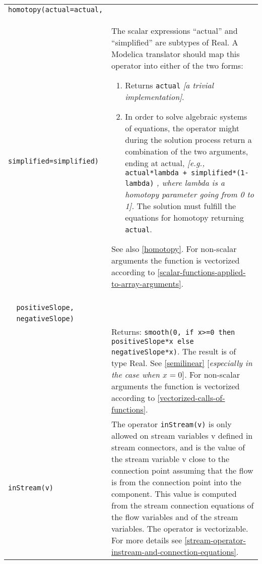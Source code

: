 \begin{longtable}{|p{5.1cm}|p{8cm}|}
\lstinline[basicstyle=\ttfamily]!homotopy(actual=actual,!\\
\lstinline[basicstyle=\ttfamily]!   simplified=simplified)! & The scalar expressions ``actual'' and ``simplified'' are subtypes of
Real. A Modelica translator should map this operator into either of the
two forms:

\begin{enumerate}
\item
  Returns \lstinline[basicstyle=\ttfamily]!actual! \emph{{[}a trivial implementation{]}}.
\item
  In order to solve algebraic systems of equations, the operator might
  during the solution process return a combination of the two arguments,
  ending at actual, \emph{{[}e.g.,}
  \lstinline[basicstyle=\ttfamily]!actual*lambda + simplified*(1-lambda)! \emph{,
  where lambda is a homotopy parameter going from 0 to 1{]}.}
  The solution must fulfill the equations for homotopy returning
  \lstinline[basicstyle=\ttfamily]!actual!.
\end{enumerate}

See also \autoref{homotopy}. For non-scalar arguments the function is
vectorized according to \autoref{scalar-functions-applied-to-array-arguments}.\\ 
\hline

\begin{tabular}{@{}p{5.1cm}@{}}
\lstinline[basicstyle=\ttfamily]!semiLinear(x,!\\
\lstinline[basicstyle=\ttfamily]!  positiveSlope,!\\
\lstinline[basicstyle=\ttfamily]!  negativeSlope)!\\ 
\end{tabular}& 
Returns:
\lstinline[basicstyle=\ttfamily]!smooth(0, if x>=0 then positiveSlope*x else negativeSlope*x)!.
The result is of type Real. See \autoref{semilinear} {[}\emph{especially in
the case when $x = 0$}{]}\emph{.} For non-scalar arguments the function is
vectorized according to \autoref{vectorized-calls-of-functions}.\\ 
\hline

\lstinline[basicstyle=\ttfamily]!inStream(v)! & The operator \lstinline[basicstyle=\ttfamily]!inStream(v)! is only allowed on stream
variables v defined in stream connectors, and is the value of the stream
variable v close to the connection point assuming that the flow is from
the connection point into the component. This value is computed from the
stream connection equations of the flow variables and of the stream
variables. The operator is vectorizable. For more details see \autoref{stream-operator-instream-and-connection-equations}.\\ 
\hline


\end{longtable}
